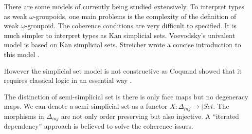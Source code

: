 There are some models of \hott currently being studied extensively.
To interpret types as weak $\omega$-groupoids, one main problems is
the complexity of the definition of weak $\omega$-groupoid. The
coherence conditions are very difficult to specified.
It is much simpler to interpret types as Kan simplicial sets.
Voevodsky's univalent model\cite{klv:ssetmodel} is based on Kan simplicial sets. 
 Streicher wrote a concise introduction to this model \cite{DBLP:dblp_journals/japll/Streicher14}. 



\iffalse %

\begin{definition}
A simplicial set $X$ is a functor from $\Delta^{op}$ to $\Set$ where
$\Delta$ is the simplex category.
\end{definition}

$\Delta^{op}$ is a category whose objects are non-empty totally ordered
finite sets. The morphisms are order-preserving functions. 
Face maps and degeneracy maps are the most important morphisms in this
category.

A simplexes is a generalisation of a triangle to arbitrary
dimensions. $3$-dimensional simplex is tetrahedron and $k+1$-simplex can
be obtained by adding one point to $k$-simplex which does not lie in the
dimension where the $k$-simplex is.

A simplicial complex is a collection of simplexes. Topologically speaking, it
is constructed by gluing n-dimensional simplexes together. 
\todo{show an example graph}

A simplicial set, therefore, can be illustrate by the same graph where
the set of points is given by $X_0$, the set of lines is $X_1$ and so
on. The graph looks very similar to n-groupoids. In fact simplical
sets can interpret types in a similar way (?).

\fi




However the simplicial set model is not constructive as Coquand showed
that it requires classical logic in an essential way \cite{TC:sset}.


The distinction of semi-simplicial set is there is only face maps
but no degeneracy maps. We can denote a semi-simplicial set as a
functor $X : \Delta_{inj} \rightarrow |Set$. The morphisms in $\Delta_{inj}$ are not only order preserving
but also injective.
A “iterated dependency” approach is believed to solve the coherence
issues.


